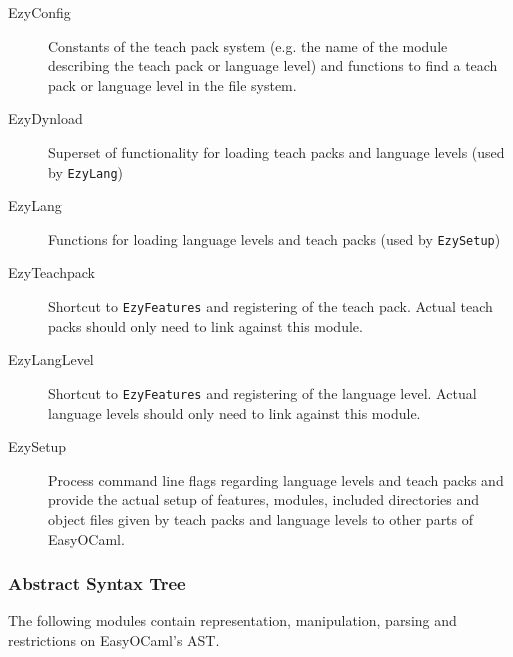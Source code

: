 \begin{description}
    \item[EzyConfig] Constants of the teach pack system (e.g. the 
        name of the module describing the teach pack or language level) 
        and functions to find a teach pack or language level in the file 
        system.
    \item[EzyDynload] Superset of functionality for loading teach 
        packs and language levels (used by \texttt{EzyLang})
    \item[EzyLang] Functions for loading language levels and teach 
        packs (used by \texttt{EzySetup})
    \item[EzyTeachpack] Shortcut to \texttt{EzyFeatures} and 
        registering of the teach pack.  Actual teach packs should only 
        need to link against this module.
    \item[EzyLangLevel] Shortcut to \texttt{EzyFeatures} and 
        registering of the language level.  Actual language levels 
        should only need to link against this module.
    \item[EzySetup] Process command line flags regarding language 
        levels and teach packs and provide the actual setup of features, 
        modules, included directories and object files given by teach 
        packs and language levels to other parts of EasyOCaml.
\end{description}


\subsubsection{Abstract Syntax Tree}

The following modules contain representation, manipulation, parsing and 
restrictions on EasyOCaml's AST.

